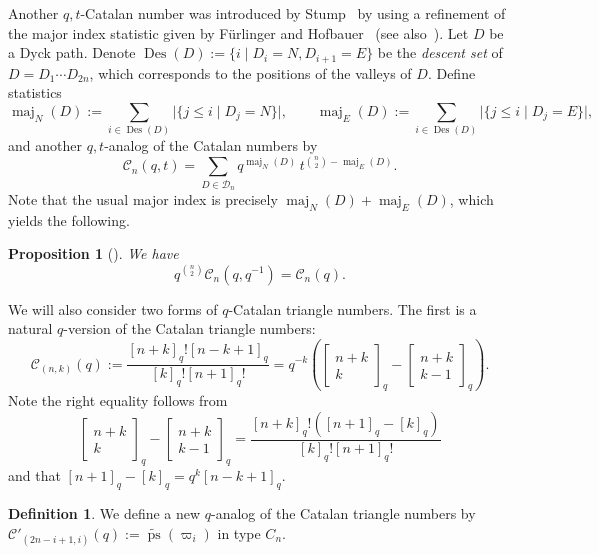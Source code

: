 \documentclass[11pt, leqno]{amsart}
\theoremstyle{plain}
\newtheorem{proposition}[theorem]{Proposition}
\theoremstyle{definition}
\newtheorem{definition}[theorem]{Definition}
\numberwithin{equation}{section}
\newcommand{\fw}{\varpi} %
\newcommand{\seteq}{\mathbin{:=}}
\newcommand{\Cat}{\mathcal{C}} %
\newcommand{\Dyck}{\mathcal{D}} %
\newcommand{\qbinom}[3]{\left[ \begin{matrix} #1 \\ #2 \end{matrix} \right]_{#3}} %
\newcommand{\ps}{\operatorname{ps}} %
\newcommand{\nps}{\widetilde{\ps}} %
\newcommand{\Des}{\operatorname{Des}} %
\newcommand{\maj}{\operatorname{maj}} %
\newcommand{\defn}[1]{{\color{darkred}\emph{#1}}} %
\begin{document}
Another $q,t$-Catalan number was introduced by Stump~\cite{Stump08} by using a refinement of the major index statistic given by F\"urlinger and Hofbauer~\cite[Sec.~5]{FH85} (see also~\cite[St000027,St000947,St001161]{FindStat}). Let $D$ be a Dyck path. Denote $\Des(D) \seteq \{i \mid D_i = N, D_{i+1} = E \}$ be the \defn{descent set} of $D = D_1 \cdots D_{2n}$, which corresponds to the positions of the valleys of $D$. Define statistics
\[
\maj_N(D) \seteq \sum_{i \in \Des(D)} \lvert \{ j \leq i \mid D_j = N \} \rvert,
\qquad
\maj_E(D) \seteq \sum_{i \in \Des(D)} \lvert \{ j \leq i \mid D_j = E \} \rvert,
\]
and another $q,t$-analog of the Catalan numbers by
\[
\Cat_n(q,t) = \sum_{D \in \Dyck_n} q^{\maj_N(D)} \, t^{\binom{n}{2} - \maj_E(D)}.
\]
Note that the usual major index is precisely $\maj_N(D) + \maj_E(D)$, which yields the following.

\begin{proposition}[{\cite{Stump08}}]
\label{prop:specialized_stump}
We have
\[
q^{\binom{n}{2}} \Cat_n(q,q^{-1}) = \Cat_n(q).
\]
\end{proposition}

We will also consider two forms of $q$-Catalan triangle numbers.
The first is a natural $q$-version of the Catalan triangle numbers:
\[
\Cat_{(n,k)}(q) \seteq \frac{[n+k]_q! [n-k+1]_q}{[k]_q! [n+1]_q!} = q^{-k} \left( \qbinom{n+k}{k}{q} - \qbinom{n+k}{k-1}{q} \right).
\]
Note the right equality follows from
\[
\qbinom{n+k}{k}{q} - \qbinom{n+k}{k-1}{q} = \frac{[n+k]_q! ([n+1]_q -[k]_q)}{[k]_q! [n+1]_q!}
\]
and that $[n+1]_q - [k]_q = q^k [n-k+1]_q$.

\begin{definition}
We define a new $q$-analog of the Catalan triangle numbers by $\Cat'_{(2n-i+1,i)}(q) \seteq \nps(\fw_i)$ in type $C_n$. 
\end{definition}
\end{document}
